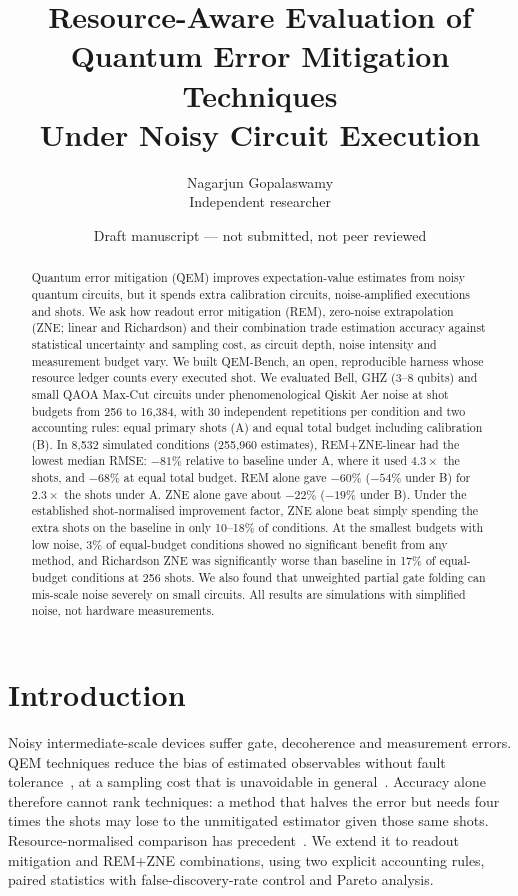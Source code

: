 \documentclass[11pt]{article}
\title{Resource-Aware Evaluation of Quantum Error Mitigation Techniques\\Under Noisy Circuit Execution}
\author{Nagarjun Gopalaswamy\\Independent researcher}
\date{Draft manuscript --- not submitted, not peer reviewed}
\begin{document}
\maketitle

\begin{abstract}
Quantum error mitigation (QEM) improves expectation-value estimates from noisy quantum circuits, but it spends extra
calibration circuits, noise-amplified executions and shots. We ask how readout error mitigation (REM), zero-noise
extrapolation (ZNE; linear and Richardson) and their combination trade estimation accuracy against statistical uncertainty
and sampling cost, as circuit depth, noise intensity and measurement budget vary. We built QEM-Bench, an open,
reproducible harness whose resource ledger counts every executed shot. We evaluated Bell, GHZ (3--8 qubits) and small QAOA
Max-Cut circuits under phenomenological Qiskit Aer noise at shot budgets from 256 to 16{,}384, with 30 independent
repetitions per condition and two accounting rules: equal primary shots (A) and equal total budget including calibration (B).
In 8{,}532 simulated conditions (255{,}960 estimates), REM+ZNE-linear had the lowest median RMSE: $-81\%$ relative to
baseline under A, where it used $4.3\times$ the shots, and $-68\%$ at equal total budget. REM alone gave $-60\%$ ($-54\%$ under B) for
$2.3\times$ the shots under A. ZNE alone gave about $-22\%$ ($-19\%$ under B). Under the established shot-normalised improvement
factor, ZNE alone beat simply spending the extra shots on the baseline in only 10--18\% of conditions. At the smallest budgets with low noise,
3\% of equal-budget conditions showed no significant benefit from any method, and Richardson ZNE was significantly worse than baseline in 17\% of
equal-budget conditions at 256 shots. We also found that unweighted partial gate folding can mis-scale noise severely on small
circuits. All results are simulations with simplified noise, not hardware measurements.
\end{abstract}

\section{Introduction}
Noisy intermediate-scale devices suffer gate, decoherence and measurement errors. QEM techniques reduce the bias of
estimated observables without fault tolerance~\cite{temme2017,li2017,endo2018,cai2023review}, at a sampling cost that is
unavoidable in general~\cite{takagi2022,quek2024}. Accuracy alone therefore cannot rank techniques: a method that halves the error
but needs four times the shots may lose to the unmitigated estimator given those same shots. Resource-normalised comparison has
precedent~\cite{russo2023}. We extend it to readout mitigation and REM+ZNE combinations, using two explicit accounting rules,
paired statistics with false-discovery-rate control and Pareto analysis.
\end{document}
